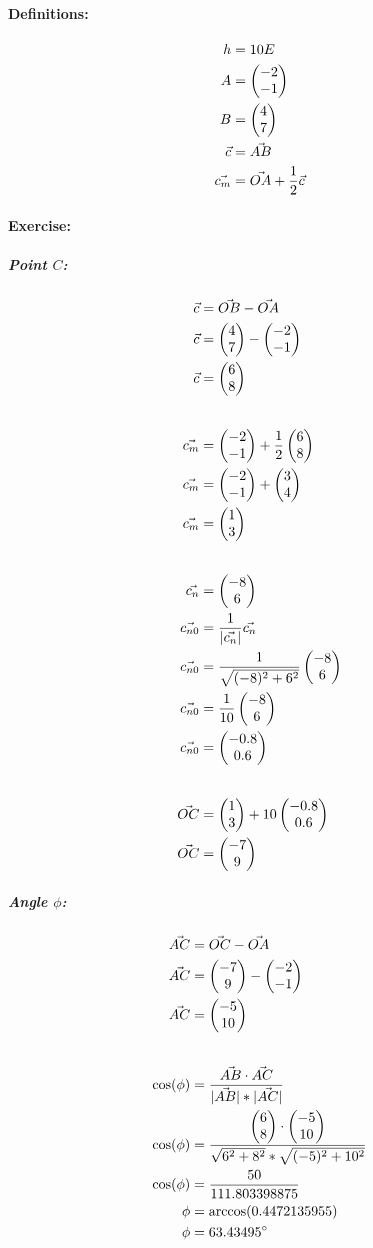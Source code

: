 \def\vOC{\begin{pmatrix}
        -7 \\ 
        9
\end{pmatrix}}

\paragraph{Definitions:}
\begin{align}
    h &= 10 E \\
    A &= \begin{pmatrix} -2 \\ -1 \end{pmatrix} \\
    B &= \begin{pmatrix} 4 \\ 7 \end{pmatrix} \\
    \vec{c} &= \vec{AB} \\
    \vec{c_m} &= \vec{OA} + \frac{1}{2} \vec{c}
\end{align}

\paragraph{Exercise:}
\subparagraph{Point $C$:}
\begin{align}
    \vec{c} &= \vec{OB} - \vec{OA} \\
    \vec{c} &= \B - \A \\
    \vec{c} &= \AB \\[20pt]
    \vec{c_m} &= \A + \frac{1}{2}\AB \\
    \vec{c_m} &= \A  + \ABhalf \\
    \vec{c_m} &= \ABmid \\[20pt]
    \vec{c_n} &= \ABnorm \\
    \vec{c_{n0}} &= \frac{1}{|\vec{c_n}|}\vec{c_n} \\
    \vec{c_{n0}} &= \frac{1}{\ABnrommag}\ABnorm \\
    \vec{c_{n0}} &= \frac{1}{10}\ABnorm \\
    \vec{c_{n0}} &= \ABmidzero \\[20pt]
    \vec{OC} &= \ABmid + \height\ABmidzero \\
    \vec{OC} &= \vOC
\end{align}

\subparagraph{Angle $\phi$:}
\begin{align}
    \vec{AC} &= \vec{OC} - \vec{OA} \\
    \vec{AC} &= \vOC - \A \\
    \vec{AC} &= \vAC \\[20pt]
    \cos(\phi) &= \frac{\vec{AB} \cdot \vec{AC}}{|\vec{AB}| * |\vec{AC}|} \\
    \cos(\phi) &= \frac{\AB \cdot \vAC}{\sqrt{6^2 + 8^2} * \sqrt{(-5)^2 + 10^2}} \\
    \cos(\phi) &= \frac{50}{111.803398875} \\
    \phi &= \arccos(0.4472135955) \\
    \phi &= 63.43495^\circ
\end{align}

